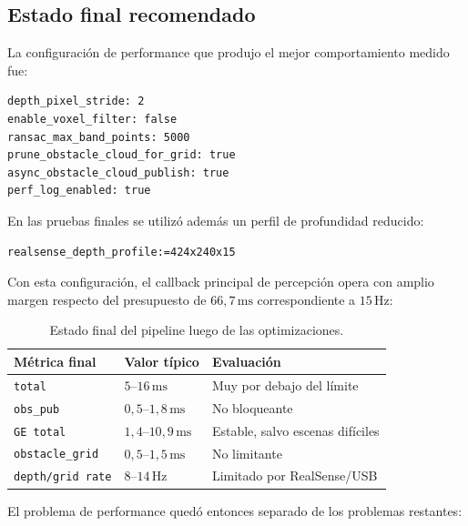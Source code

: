 \subsection{Estado final recomendado}
\label{subsec:perf-estado-final}

La configuración de performance que produjo el mejor comportamiento medido fue:

\begin{verbatim}
depth_pixel_stride: 2
enable_voxel_filter: false
ransac_max_band_points: 5000
prune_obstacle_cloud_for_grid: true
async_obstacle_cloud_publish: true
perf_log_enabled: true
\end{verbatim}

En las pruebas finales se utilizó además un perfil de profundidad reducido:

\begin{verbatim}
realsense_depth_profile:=424x240x15
\end{verbatim}

Con esta configuración, el callback principal de percepción opera con amplio
margen respecto del presupuesto de $66{,}7\,\mathrm{ms}$ correspondiente a
$15\,\mathrm{Hz}$:

\begin{table}[H]
\centering
\begin{tabular}{lll}
\toprule
\textbf{Métrica final} & \textbf{Valor típico} & \textbf{Evaluación} \\
\midrule
\texttt{total} & $5$--$16\,\mathrm{ms}$ & Muy por debajo del límite \\
\texttt{obs\_pub} & $0{,}5$--$1{,}8\,\mathrm{ms}$ & No bloqueante \\
\texttt{GE total} & $1{,}4$--$10{,}9\,\mathrm{ms}$ & Estable, salvo escenas difíciles \\
\texttt{obstacle\_grid} & $0{,}5$--$1{,}5\,\mathrm{ms}$ & No limitante \\
\texttt{depth/grid rate} & $8$--$14\,\mathrm{Hz}$ & Limitado por RealSense/USB \\
\bottomrule
\end{tabular}
\caption{Estado final del pipeline luego de las optimizaciones.}
\label{tab:perf-final}
\end{table}

El problema de performance quedó entonces separado de los problemas restantes:

